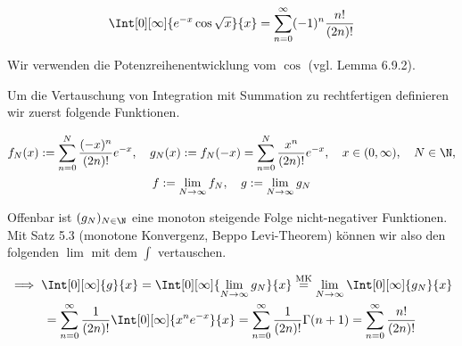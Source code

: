 
\begin{exercise}

\phantom{}

\begin{align*}
    \Int[0][\infty]{e^{-x} \cos \sqrt x}{x}
    =
    \sum_{n=0}^\infty
    (-1)^n
    \frac{n!}{(2 n)!}
\end{align*}

\end{exercise}


\begin{solution}

Wir verwenden die Potenzreihenentwicklung vom $\cos$ (vgl. Lemma 6.9.2).


Um die Vertauschung von Integration mit Summation zu rechtfertigen definieren wir zuerst folgende Funktionen.

\begin{gather*}
    f_N(x)
    :=
    \sum_{n=0}^N
    \frac{(-x)^n}{(2 n)!}
    e^{-x},
    \quad
    g_N(x)
    :=
    f_N(-x)
    =
    \sum_{n=0}^N
    \frac{x^n}{(2 n)!}
    e^{-x},
    \quad
    x \in (0, \infty),
    \quad
    N \in \N, \\
    f := \lim_{N \to \infty} f_N,
    \quad
    g := \lim_{N \to \infty} g_N
\end{gather*}


Offenbar ist $(g_N)_{N \in \N}$ eine monoton steigende Folge nicht-negativer Funktionen.
Mit Satz 5.3 (monotone Konvergenz, Beppo Levi-Theorem) können wir also den folgenden $\lim$ mit dem $\int$ vertauschen.

\begin{multline*}
    \implies
    \Int[0][\infty]{g}{x}
    =
    \Int[0][\infty]
    {
        \lim_{N \to \infty}
        g_N
    }{x}
    \stackrel
    {
        \mathrm{MK}
    }{=}
    \lim_{N \to \infty}
    \Int[0][\infty]
    {
        g_N
    }{x} \\
    =
    \sum_{n=0}^\infty
    \frac{1}{(2 n)!}
    \Int[0][\infty]{x^n e^{-x}}{x}
    =
    \sum_{n=0}^\infty
    \frac{1}{(2 n)!}
    \Gamma(n+1)
    =
    \sum_{n=0}^\infty
    \frac{n!}{(2 n)!}
\end{multline*}


\end{solution}
